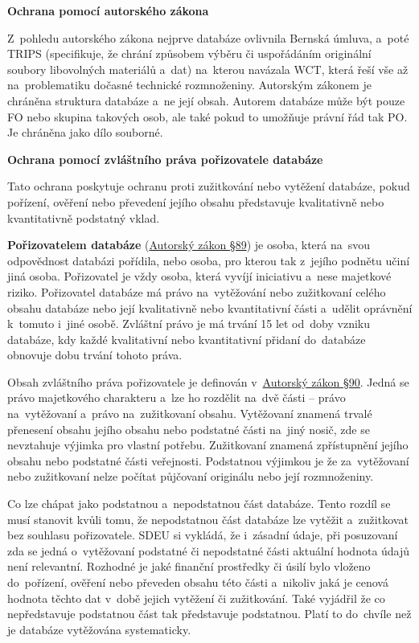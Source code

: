 \vspace{0.3cm}
\begin{Large}
\textbf{Ochrana pomocí autorského zákona}
\end{Large}

Z~pohledu autorského zákona nejprve databáze ovlivnila Bernská úmluva, a~poté TRIPS (specifikuje, že chrání způsobem výběru či uspořádáním originální soubory libovolných materiálů a~dat) na~kterou navázala WCT, která řeší vše až na~problematiku dočasné technické rozmnoženiny. Autorským zákonem je chráněna struktura databáze a~ne její obsah. Autorem databáze může být pouze FO nebo skupina takových osob, ale také pokud to umožňuje právní řád tak PO. Je chráněna jako dílo souborné.

\vspace{0.3cm}
\begin{Large}
\textbf{Ochrana pomocí zvláštního práva pořizovatele databáze}
\end{Large}

Tato ochrana poskytuje ochranu proti zužitkování nebo vytěžení databáze, pokud pořízení, ověření nebo převedení jejího obsahu představuje kvalitativně nebo kvantitativně podstatný vklad.

\textbf{Pořizovatelem databáze} (\href{https://www.zakonyprolidi.cz/cs/2000-121#p89}{Autorský zákon §89}) je osoba, která na~svou odpovědnost databázi pořídila, nebo osoba, pro kterou tak z~jejího podnětu učiní jiná osoba. Pořizovatel je vždy osoba, která vyvíjí iniciativu a~nese majetkové riziko. Pořizovatel databáze má právo na~vytěžování nebo zužitkovaní celého obsahu databáze nebo její kvalitativně nebo kvantitativní části a~udělit oprávnění k~tomuto i~jiné osobě. Zvláštní právo je má trvání 15 let od~doby vzniku databáze, kdy každé kvalitativní nebo kvantitativní přidaní do~databáze obnovuje dobu trvání tohoto práva.

Obsah zvláštního práva pořizovatele je definován v~\href{https://www.zakonyprolidi.cz/cs/2000-121#p90}{Autorský zákon §90}. Jedná se právo majetkového charakteru a~lze ho rozdělit na~dvě části -- právo na~vytěžovaní a~právo na~zužitkovaní obsahu. Vytěžovaní znamená trvalé přenesení obsahu jejího obsahu nebo podstatné části na~jiný nosič, zde se nevztahuje výjimka pro vlastní potřebu. Zužitkovaní znamená zpřístupnění jejího obsahu nebo podstatné části veřejnosti. Podstatnou výjimkou je že za~vytěžovaní nebo zužitkovaní nelze počítat půjčovaní originálu nebo její rozmnoženiny.

Co lze chápat jako podstatnou a~nepodstatnou část databáze. Tento rozdíl se musí stanovit kvůli tomu, že nepodstatnou část databáze lze vytěžit a~zužitkovat bez souhlasu pořizovatele. SDEU si vykládá, že i~zásadní údaje, při posuzovaní zda se jedná o~vytěžovaní podstatné či nepodstatné části aktuální hodnota údajů není relevantní. Rozhodné je jaké finanční prostředky či úsilí bylo vloženo do~pořízení, ověření nebo převeden obsahu této části a~nikoliv jaká je cenová hodnota těchto dat v~době jejich vytěžení či zužitkování. Také vyjádřil že co nepředstavuje podstatnou část tak představuje podstatnou. Platí to do~chvíle než je databáze vytěžována systematicky.

